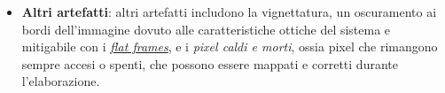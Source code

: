 \begin{itemize}
    \item \textbf{Altri artefatti}: altri artefatti includono la vignettatura, un oscuramento ai bordi dell'immagine dovuto alle caratteristiche ottiche del sistema e mitigabile con i \hyperref[subsec:flat]{\textit{flat frames}}, e i \textit{pixel caldi e morti},  ossia pixel che rimangono sempre accesi o spenti, che possono essere mappati e corretti durante l'elaborazione.

\end{itemize}

\cleardoublepage